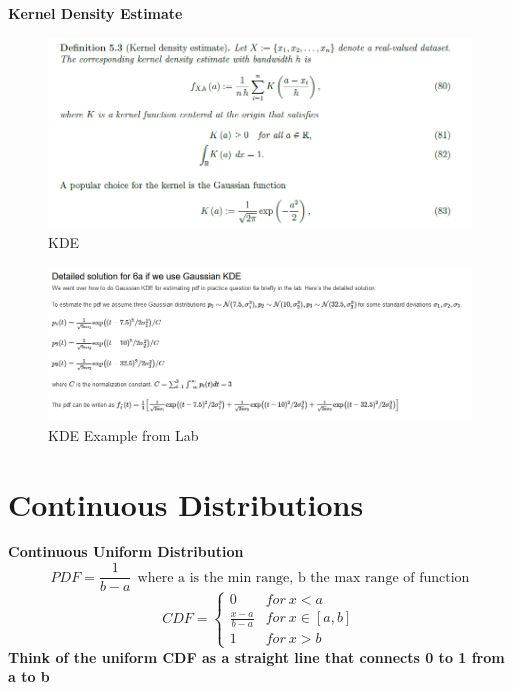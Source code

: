 \documentclass[12pt,twoside]{article}
\begin{document}
\textbf{Kernel Density Estimate}
\begin{figure}[h!]
    \centering
    \includegraphics[scale=.7]{Pictures/KDE.png}
    \caption{KDE}
    \label{KDE}
\end{figure}
\begin{figure}
    \centering
    \includegraphics[scale=.7]{Pictures/kde gauss.png}
    \caption{KDE Example from Lab}
    \label{fig:my_label}
\end{figure}
\newpage

\section{Continuous Distributions}

\textbf{Continuous Uniform Distribution}\\
$$
    PDF = \frac{1}{b-a} \ \ \text{where a is the min range, b the max range of function}
$$
$$
    CDF = \begin{cases} 0 & for \  x<a \\ \frac{x-a}{b-a} & for \ x\in [a,b] \\ 1 & for \ x > b \end{cases}
$$
\textbf{Think of the uniform CDF as a straight line that connects 0 to 1 from a to b} \\
\end{document}
